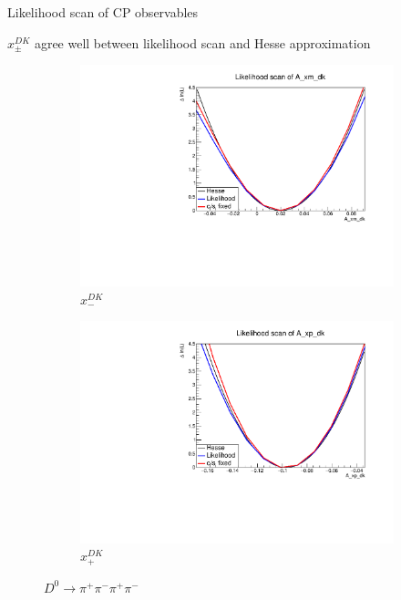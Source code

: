 \documentclass{beamer}
\begin{document}
\begin{frame}{Likelihood scan of CP observables}
  \begin{center}
    $x_\pm^{DK}$ agree well between likelihood scan and Hesse approximation
  \end{center}
  \begin{figure}
    \centering
    \begin{subfigure}{0.5\textwidth}
      \centering
      \includegraphics[width=1.0\textwidth]{Plots/A_xm_dk_likelihood_scan_pipipipi.pdf}
      \vspace{-0.3cm}
      \caption*{$x_-^{DK}$}
    \end{subfigure}%
    \begin{subfigure}{0.5\textwidth}
      \centering
      \includegraphics[width=1.0\textwidth]{Plots/A_xp_dk_likelihood_scan_pipipipi.pdf}
      \vspace{-0.3cm}
      \caption*{$x_+^{DK}$}
    \end{subfigure}
    \caption*{$D^0\to\pi^+\pi^-\pi^+\pi^-$}
  \end{figure}
\end{frame}
\end{document}
